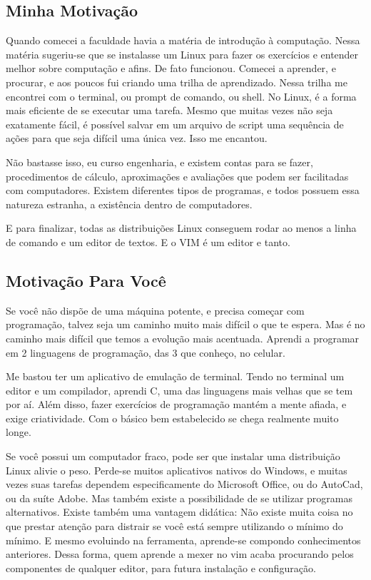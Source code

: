 \documentclass[a4paper, 12pt]{article}
\begin{document}
\subsection{Minha Motivação}
Quando comecei a faculdade havia a matéria de introdução à computação.
Nessa matéria sugeriu-se que se instalasse um Linux para fazer os exercícios e entender melhor sobre computação e afins.
De fato funcionou.
Comecei a aprender, e procurar, e aos poucos fui criando uma trilha de aprendizado.
Nessa trilha me encontrei com o terminal, ou prompt de comando, ou shell.
No Linux, é a forma mais eficiente de se executar uma tarefa.
Mesmo que muitas vezes não seja exatamente fácil, é possível salvar em um arquivo de script uma sequência de ações para que seja difícil uma única vez.
Isso me encantou.

Não bastasse isso, eu curso engenharia, e existem contas para se fazer,
procedimentos de cálculo, aproximações e avaliações que podem ser facilitadas com computadores.
Existem diferentes tipos de programas, e todos possuem essa natureza estranha, a existência dentro de computadores.

E para finalizar, todas as distribuições Linux conseguem rodar ao menos a linha de comando e um editor de textos.
E o VIM é um editor e tanto.

\subsection{Motivação Para Você}
Se você não dispõe de uma máquina potente, e precisa começar com programação, talvez seja um caminho muito mais difícil o que te espera.
Mas é no caminho mais difícil que temos a evolução mais acentuada.
Aprendi a programar em 2 linguagens de programação, das 3 que conheço, no celular.

Me bastou ter um aplicativo de emulação de terminal.
Tendo no terminal um editor e um compilador, aprendi C, uma das linguagens mais velhas que se tem por aí.
Além disso, fazer exercícios de programação mantém a mente afiada, e exige criatividade.
Com o básico bem estabelecido se chega realmente muito longe.

Se você possui um computador fraco, pode ser que instalar uma distribuição Linux alivie o peso.
Perde-se muitos aplicativos nativos do Windows, e muitas vezes suas tarefas dependem especificamente do Microsoft Office, ou do AutoCad, ou da suíte Adobe.
Mas também existe a possibilidade de se utilizar programas alternativos.
Existe também uma vantagem didática:
Não existe muita coisa no que prestar atenção para distrair se você está sempre utilizando o mínimo do mínimo.
E mesmo evoluindo na ferramenta, aprende-se compondo conhecimentos anteriores.
Dessa forma, quem aprende a mexer no vim acaba procurando pelos componentes de qualquer editor, para futura instalação e configuração.
\end{document}
